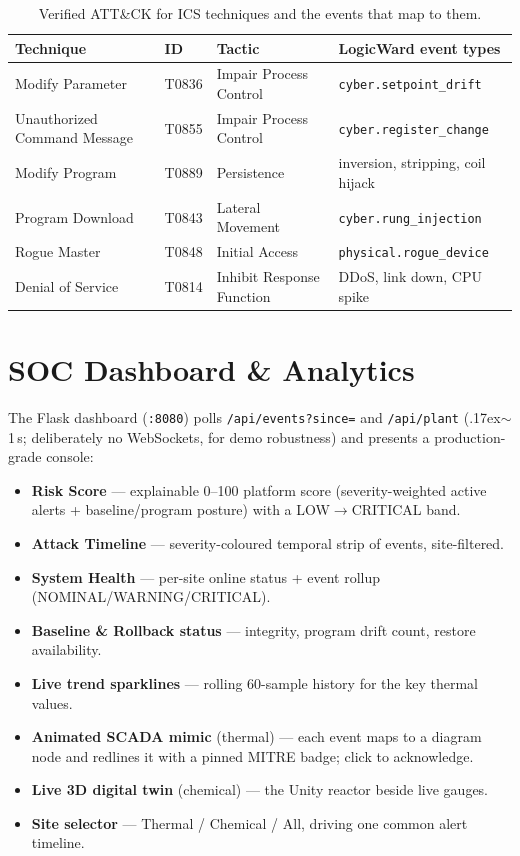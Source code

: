 \documentclass[11pt,a4paper]{article}
\newcommand{\code}[1]{\texttt{\small #1}}
\begin{document}
\begin{table}[h]\small\centering
\renewcommand{\arraystretch}{1.2}
\begin{tabularx}{\textwidth}{@{}l l l L@{}}
\toprule
\textbf{Technique} & \textbf{ID} & \textbf{Tactic} & \textbf{LogicWard event types}\\
\midrule
Modify Parameter & T0836 & Impair Process Control & \code{cyber.setpoint\_drift}\\
Unauthorized Command Message & T0855 & Impair Process Control & \code{cyber.register\_change}\\
Modify Program & T0889 & Persistence & inversion, stripping, coil hijack\\
Program Download & T0843 & Lateral Movement & \code{cyber.rung\_injection}\\
Rogue Master & T0848 & Initial Access & \code{physical.rogue\_device}\\
Denial of Service & T0814 & Inhibit Response Function & DDoS, link down, CPU spike\\
\bottomrule
\end{tabularx}
\caption{Verified ATT\&CK for ICS techniques and the events that map to them.}
\end{table}

\section{SOC Dashboard \& Analytics}
The Flask dashboard (\code{:8080}) polls \code{/api/events?since=} and \code{/api/plant} (\raise.17ex\hbox{$\scriptstyle\sim$}1\,s;
deliberately no WebSockets, for demo robustness) and presents a production-grade console:
\begin{itemize}[leftmargin=1.3em,itemsep=2pt]
  \item \textbf{Risk Score} --- explainable 0--100 platform score (severity-weighted active alerts
        + baseline/program posture) with a LOW$\to$CRITICAL band.
  \item \textbf{Attack Timeline} --- severity-coloured temporal strip of events, site-filtered.
  \item \textbf{System Health} --- per-site online status + event rollup (NOMINAL/WARNING/CRITICAL).
  \item \textbf{Baseline \& Rollback status} --- integrity, program drift count, restore availability.
  \item \textbf{Live trend sparklines} --- rolling 60-sample history for the key thermal values.
  \item \textbf{Animated SCADA mimic} (thermal) --- each event maps to a diagram node and redlines it
        with a pinned MITRE badge; click to acknowledge.
  \item \textbf{Live 3D digital twin} (chemical) --- the Unity reactor beside live gauges.
  \item \textbf{Site selector} --- Thermal / Chemical / All, driving one common alert timeline.
\end{itemize}
\end{document}
